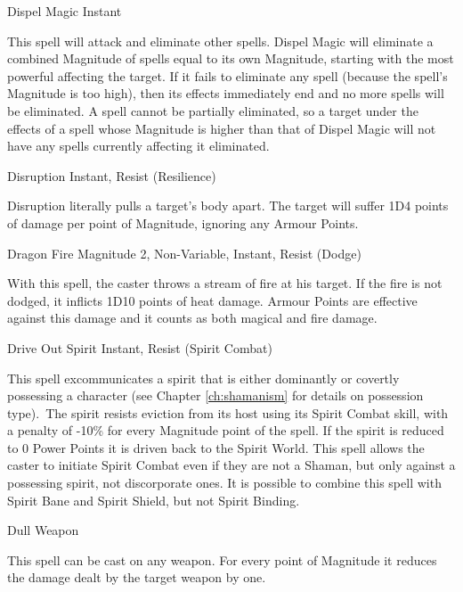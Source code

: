 \begin{rpg-spell}
{Dispel Magic}
{Instant}

This spell will attack and eliminate other spells. Dispel Magic will eliminate a combined Magnitude of spells equal to its own Magnitude, starting with the most powerful affecting the target. If it fails to eliminate any spell (because the spell’s Magnitude is too high), then its effects immediately end and no more spells will be eliminated. A spell cannot be partially eliminated, so a target under the effects of a spell whose Magnitude is higher than that of Dispel Magic will not have any spells currently affecting it eliminated. 
\end{rpg-spell}


\begin{rpg-spell}
{Disruption}
{Instant, Resist (Resilience)}

Disruption literally pulls a target’s body apart. The target will suffer 1D4 points of damage per point of Magnitude, ignoring any Armour Points. 
\end{rpg-spell}


\begin{rpg-spell}
{Dragon Fire}
{Magnitude 2, Non-Variable, Instant, Resist (Dodge)}

With this spell, the caster throws a stream of fire at his target. If the fire is not dodged, it inflicts 1D10 points of heat damage. Armour Points are effective against this damage and it counts as both magical and fire damage.
\end{rpg-spell}


\begin{rpg-spell}
{Drive Out Spirit}
{Instant, Resist (Spirit Combat)}

This spell excommunicates a spirit that is either dominantly or covertly possessing a character (see Chapter \ref{ch:shamanism} for details on possession type). The spirit resists eviction from its host using its Spirit Combat skill, with a penalty of -10\% for every Magnitude point of the spell. If the spirit is reduced to 0 Power Points it is driven back to the Spirit World. This spell allows the caster to initiate Spirit Combat even if they are not a Shaman, but only against a possessing spirit, not discorporate ones. It is possible to combine this spell with Spirit Bane and Spirit Shield, but not Spirit Binding.
\end{rpg-spell}


\begin{rpg-spell}
{Dull Weapon}
{}

This spell can be cast on any weapon. For every point of Magnitude it reduces the damage dealt by the target weapon by one. 
\end{rpg-spell}


